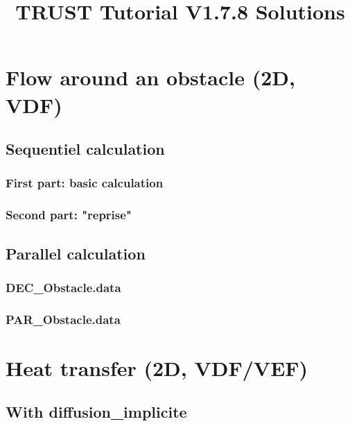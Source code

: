 \documentclass[english]{article}
\begin{document}
\title{TRUST Tutorial V1.7.8 Solutions}
\maketitle
\tableofcontents{}
\newpage

\section{Flow around an obstacle (2D, VDF)}
\subsection{Sequentiel calculation}
\subsubsection{First part: basic calculation}

\subsubsection{Second part: "reprise"}


\subsection{Parallel calculation}
\subsubsection{DEC\_Obstacle.data}

\subsubsection{PAR\_Obstacle.data}



\section{Heat transfer (2D, VDF/VEF)}
\subsection{With diffusion\_implicite}

\end{document}
